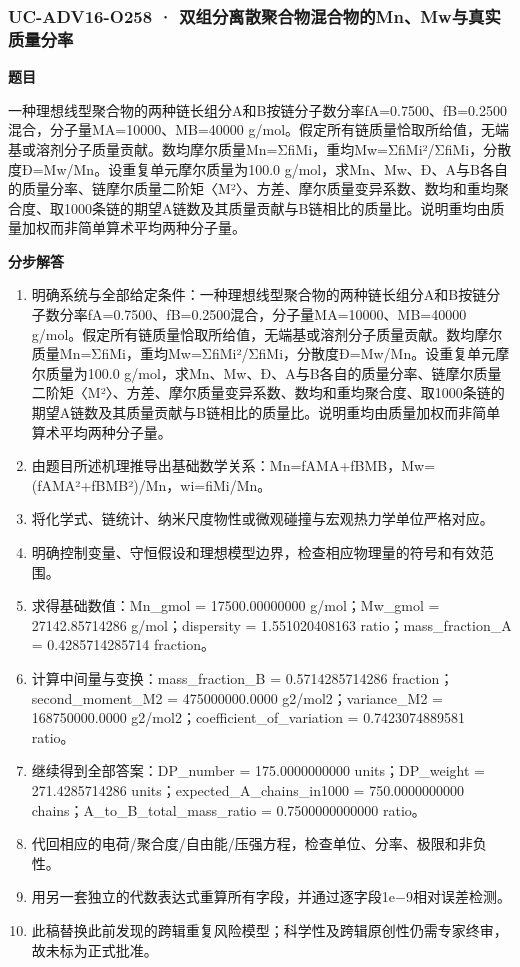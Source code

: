 \documentclass[UTF8,11pt,a4paper]{ctexart}
\begin{document}
\subsubsection*{UC-ADV16-O258 · 双组分离散聚合物混合物的Mn、Mw与真实质量分率}
\noindent\textbf{题目}\par
一种理想线型聚合物的两种链长组分A和B按链分子数分率fA=0.7500、fB=0.2500混合，分子量MA=10000、MB=40000 g/mol。假定所有链质量恰取所给值，无端基或溶剂分子质量贡献。数均摩尔质量Mn=ΣfiMi，重均Mw=ΣfiMi²/ΣfiMi，分散度Đ=Mw/Mn。设重复单元摩尔质量为100.0 g/mol，求Mn、Mw、Đ、A与B各自的质量分率、链摩尔质量二阶矩〈M²〉、方差、摩尔质量变异系数、数均和重均聚合度、取1000条链的期望A链数及其质量贡献与B链相比的质量比。说明重均由质量加权而非简单算术平均两种分子量。\par
\medskip\noindent\textbf{分步解答}
\begin{enumerate}
\item 明确系统与全部给定条件：一种理想线型聚合物的两种链长组分A和B按链分子数分率fA=0.7500、fB=0.2500混合，分子量MA=10000、MB=40000 g/mol。假定所有链质量恰取所给值，无端基或溶剂分子质量贡献。数均摩尔质量Mn=ΣfiMi，重均Mw=ΣfiMi²/ΣfiMi，分散度Đ=Mw/Mn。设重复单元摩尔质量为100.0 g/mol，求Mn、Mw、Đ、A与B各自的质量分率、链摩尔质量二阶矩〈M²〉、方差、摩尔质量变异系数、数均和重均聚合度、取1000条链的期望A链数及其质量贡献与B链相比的质量比。说明重均由质量加权而非简单算术平均两种分子量。
\item 由题目所述机理推导出基础数学关系：Mn=fAMA+fBMB，Mw=(fAMA²+fBMB²)/Mn，wi=fiMi/Mn。
\item 将化学式、链统计、纳米尺度物性或微观碰撞与宏观热力学单位严格对应。
\item 明确控制变量、守恒假设和理想模型边界，检查相应物理量的符号和有效范围。
\item 求得基础数值：Mn\_gmol = 17500.00000000 g/mol；Mw\_gmol = 27142.85714286 g/mol；dispersity = 1.551020408163 ratio；mass\_fraction\_A = 0.4285714285714 fraction。
\item 计算中间量与变换：mass\_fraction\_B = 0.5714285714286 fraction；second\_moment\_M2 = 475000000.0000 g2/mol2；variance\_M2 = 168750000.0000 g2/mol2；coefficient\_of\_variation = 0.7423074889581 ratio。
\item 继续得到全部答案：DP\_number = 175.0000000000 units；DP\_weight = 271.4285714286 units；expected\_A\_chains\_in1000 = 750.0000000000 chains；A\_to\_B\_total\_mass\_ratio = 0.7500000000000 ratio。
\item 代回相应的电荷/聚合度/自由能/压强方程，检查单位、分率、极限和非负性。
\item 用另一套独立的代数表达式重算所有字段，并通过逐字段1e−9相对误差检测。
\item 此稿替换此前发现的跨辑重复风险模型；科学性及跨辑原创性仍需专家终审，故未标为正式批准。
\end{enumerate}
\end{document}

